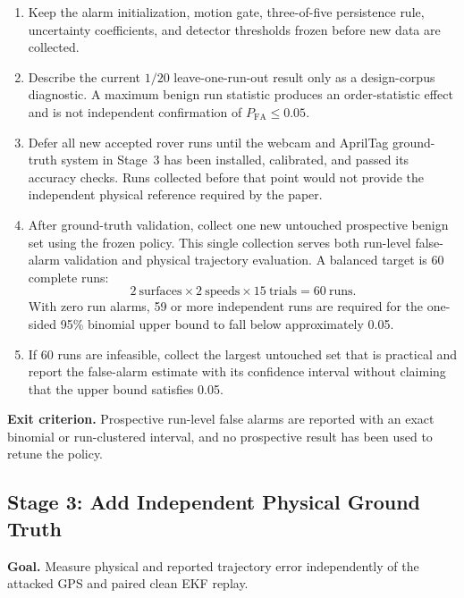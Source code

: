 \documentclass[11pt,a4paper]{article}
\begin{document}
\begin{enumerate}
    \item Keep the alarm initialization, motion gate, three-of-five persistence
    rule, uncertainty coefficients, and detector thresholds frozen before new
    data are collected.

    \item Describe the current $1/20$ leave-one-run-out result only as a
    design-corpus diagnostic. A maximum benign run statistic produces an
    order-statistic effect and is not independent confirmation of
    $P_{\mathrm{FA}} \leq 0.05$.

    \item Defer all new accepted rover runs until the webcam and AprilTag
    ground-truth system in Stage~3 has been installed, calibrated, and passed
    its accuracy checks. Runs collected before that point would not provide the
    independent physical reference required by the paper.

    \item After ground-truth validation, collect one new untouched prospective
    benign set using the frozen policy. This single collection serves both
    run-level false-alarm validation and physical trajectory evaluation. A
    balanced target is 60 complete runs:
    \[
        2\ \text{surfaces} \times 2\ \text{speeds} \times
        15\ \text{trials} = 60\ \text{runs}.
    \]
    With zero run alarms, 59 or more independent runs are required for the
    one-sided 95\% binomial upper bound to fall below approximately 0.05.

    \item If 60 runs are infeasible, collect the largest untouched set that is
    practical and report the false-alarm estimate with its confidence interval
    without claiming that the upper bound satisfies 0.05.
\end{enumerate}

\textbf{Exit criterion.} Prospective run-level false alarms are reported with
an exact binomial or run-clustered interval, and no prospective result has been
used to retune the policy.

\subsection{Stage 3: Add Independent Physical Ground Truth}

\textbf{Goal.} Measure physical and reported trajectory error independently of
the attacked GPS and paired clean EKF replay.
\end{document}
